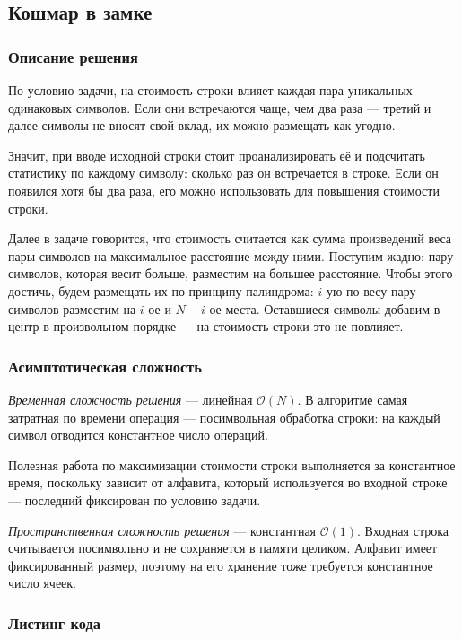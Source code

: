 \subsection{Кошмар в замке}

\subsubsection{Описание решения}

По условию задачи, на стоимость строки влияет каждая пара уникальных одинаковых символов. Если они встречаются чаще, чем два раза --- третий и далее символы не вносят свой вклад, их можно размещать как угодно.

Значит, при вводе исходной строки стоит проанализировать её и подсчитать статистику по каждому символу: сколько раз он встречается в строке. Если он появился хотя бы два раза, его можно использовать для повышения стоимости строки.

Далее в задаче говорится, что стоимость считается как сумма произведений веса пары символов на максимальное расстояние между ними. Поступим жадно: пару символов, которая весит больше, разместим на большее расстояние. Чтобы этого достичь, будем размещать их по принципу палиндрома: \( i \)-ую по весу пару символов разместим на \( i \)-ое и \( N-i \)-ое места. Оставшиеся символы добавим в центр в произвольном порядке --- на стоимость строки это не повлияет.

\subsubsection{Асимптотическая сложность}

\textit{Временная сложность решения} --- линейная \( \mathcal{O}(N) \). В алгоритме самая затратная по времени операция --- посимвольная обработка строки: на каждый символ отводится константное число операций.

Полезная работа по максимизации стоимости строки выполняется за константное время, поскольку зависит от алфавита, который используется во входной строке --- последний фиксирован по условию задачи.

\textit{Пространственная сложность решения} --- константная \( \mathcal{O}(1) \). Входная строка считывается посимвольно и не сохраняется в памяти целиком. Алфавит имеет фиксированный размер, поэтому на его хранение тоже требуется константное число ячеек.

\subsubsection{Листинг кода}

